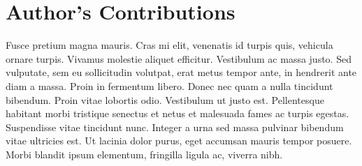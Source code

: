\section{Author's Contributions}

Fusce pretium magna mauris. Cras mi elit, venenatis id turpis quis, vehicula ornare turpis. Vivamus molestie aliquet efficitur. Vestibulum ac massa justo. Sed vulputate, sem eu sollicitudin volutpat, erat metus tempor ante, in hendrerit ante diam a massa. Proin in fermentum libero. Donec nec quam a nulla tincidunt bibendum. Proin vitae lobortis odio. Vestibulum ut justo est. Pellentesque habitant morbi tristique senectus et netus et malesuada fames ac turpis egestas. Suspendisse vitae tincidunt nunc. Integer a urna sed massa pulvinar bibendum vitae ultricies est. Ut lacinia dolor purus, eget accumsan mauris tempor posuere. Morbi blandit ipsum elementum, fringilla ligula ac, viverra nibh.